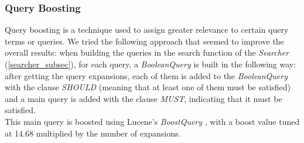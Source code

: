\enlargethispage{2\baselineskip}
\subsubsection{Query Boosting}
Query boosting is a technique used to assign greater relevance to certain query terms or queries.\newline
We tried the following approach that seemed to improve the overall results: when building the queries in the search function of the \textit{Searcher} (\ref{searcher_subsec}), for each query, a \textit{BooleanQuery} \cite{lucenebooleanquery} is built in the following way: 
after getting the query expansions, each of them is added to the \textit{BooleanQuery} with the clause \textit{SHOULD} (meaning that at least one of them must be satisfied) and a main query is added with the clause \textit{MUST}, indicating that it must be satisfied. \\
This main query is boosted using Lucene's \textit{BoostQuery} \cite{luceneboostquery}, with a boost value tuned at 14.68 multiplied by the number of expansions.

